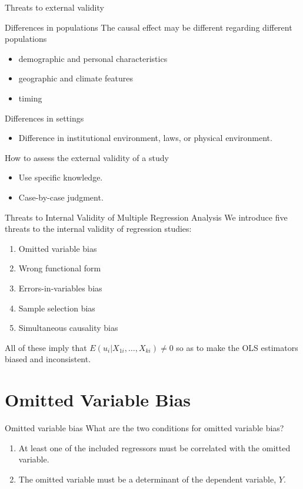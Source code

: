 \documentclass[presentation,10pt]{beamer}
\begin{document}
\begin{frame}[label={sec:org64e22e3}]{Threats to external validity}
\begin{block}{Differences in populations}
The causal effect may be different regarding different populations
\begin{itemize}
\item demographic and personal characteristics
\item geographic and climate features
\item timing
\end{itemize}
\end{block}

\begin{block}{Differences in settings}
\begin{itemize}
\item Difference in institutional environment, laws, or physical
environment.
\end{itemize}
\end{block}

\begin{block}{How to assess the external validity of a study}
\begin{itemize}
\item Use specific knowledge.
\item Case-by-case judgment.
\end{itemize}
\end{block}
\end{frame}

\begin{frame}[label={sec:org6bb9bdb}]{Threats to Internal Validity of Multiple Regression Analysis}
We introduce five threats to the internal validity of regression studies:
\begin{enumerate}
\item Omitted variable bias
\item Wrong functional form
\item Errors-in-variables bias
\item Sample selection bias
\item Simultaneous causality bias
\end{enumerate}

\vspace{0.3cm} 
All of these imply that \(E(u_i|X_{1i},…,X_{ki}) \neq 0\) so as to make
the OLS estimators biased and inconsistent.  
\end{frame}

\section{Omitted Variable Bias}
\label{sec:org62ac70b}
\begin{frame}[label={sec:org5dd421e}]{Omitted variable bias}
What are the two conditions for omitted variable bias?
\pause
\begin{enumerate}
\item At least one of the included regressors must be correlated with the
omitted variable.
\item The omitted variable must be a determinant of the dependent
variable, \(Y\).
\end{enumerate}
\end{frame}
\end{document}
